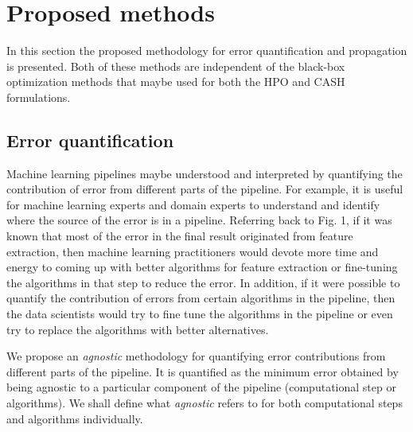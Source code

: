 \section{Proposed methods}
\label{sec3}
In this section the proposed methodology for error quantification and propagation is presented. Both of these methods are independent of the black-box optimization methods that maybe used for both the HPO and CASH formulations.

\subsection{Error quantification}
\label{subsec1}
Machine learning pipelines maybe understood and interpreted by quantifying the contribution of error from different parts of the pipeline. For example, it is useful for machine learning experts and domain experts to understand and identify where the source of the error is in a pipeline. Referring back to Fig. 1, if it was known that most of the error in the final result originated from feature extraction, then machine learning practitioners would devote more time and energy to coming up with better algorithms for feature extraction or fine-tuning the algorithms in that step to reduce the error. In addition, if it were possible to quantify the contribution of errors from certain algorithms in the pipeline, then the data scientists would try to fine tune the algorithms in the pipeline or even try to replace the algorithms with better alternatives. 

We propose an \textit{agnostic} methodology for quantifying error contributions from different parts of the pipeline. It is quantified as the minimum error obtained by being agnostic to a particular component of the pipeline (computational step or algorithms). We shall define what \textit{agnostic} refers to for both computational steps and algorithms individually.

